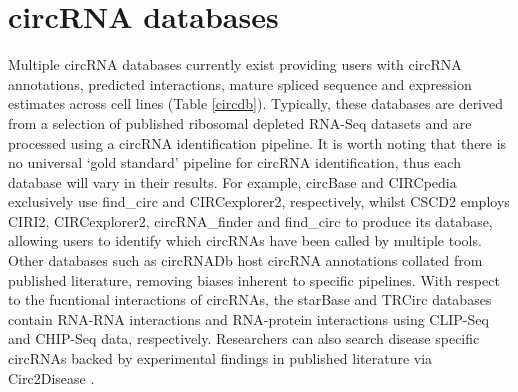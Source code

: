 \documentclass[pdflatex,sn-mathphys-num]{sn-jnl}
\begin{document}
\section{circRNA databases}
Multiple circRNA databases currently exist providing users with circRNA annotations, predicted interactions, mature spliced sequence and expression estimates across cell lines (Table \ref{circdb}). Typically, these databases are derived from a selection of published ribosomal depleted RNA-Seq datasets \cite{find_circ,Salzman2012,Jeck2012Dec,Salzman2014Jun,Ivanov2015Jan,Rybak-Wolf2015Jun,Ashwal-Fluss2014Oct,Maass2017Nov} and are processed using a circRNA identification pipeline. It is worth noting that there is no universal `gold standard' pipeline for circRNA identification, thus each database will vary in their results. For example, circBase \cite{circbase} and CIRCpedia exclusively use find\_circ and CIRCexplorer2, respectively, whilst CSCD2 \cite{CSCD2} employs CIRI2, CIRCexplorer2, circRNA\_finder and find\_circ to produce its database, allowing users to identify which circRNAs have been called by multiple tools. Other databases such as circRNADb \cite{circrnadb} host circRNA annotations collated from published literature, removing biases inherent to specific pipelines. With respect to the fucntional interactions of circRNAs, the starBase \cite{starbase} and TRCirc \cite{TRCirc} databases contain RNA-RNA interactions and RNA-protein interactions using CLIP-Seq and CHIP-Seq data, respectively. Researchers can also search disease specific circRNAs backed by experimental findings in published literature via Circ2Disease \cite{circ2disease}. \par
\end{document}
